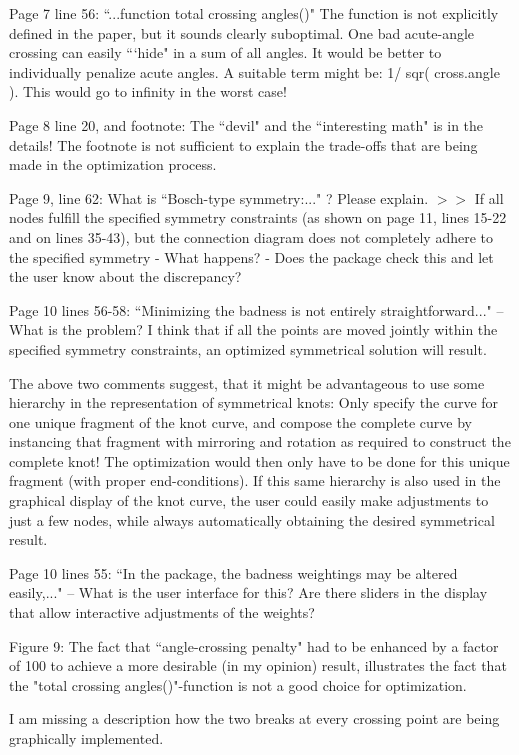 \documentclass[12pt]{article}
\begin{document}
Page 7 line 56: ``...function total crossing angles()" The function is
not explicitly defined in the paper, but it sounds clearly suboptimal.
One bad acute-angle crossing can easily ```hide" in a sum of all angles.
It would be better to individually penalize acute angles.  A suitable
term might be: 1/ sqr( cross.angle ).  This would go to infinity in
the worst case!

Page 8 line 20, and footnote: The ``devil" and the ``interesting math"
is in the details!  The footnote is not sufficient to explain the
trade-offs that are being made in the optimization process.

Page 9, line 62: What is ``Bosch-type symmetry:..." ?  Please explain.
$>>$ If all nodes fulfill the specified symmetry constraints (as shown
on page 11, lines 15-22 and on lines 35-43), but the connection
diagram does not completely adhere to the specified symmetry - What
happens? - Does the package check this and let the user know about the
discrepancy?

Page 10 lines 56-58: ``Minimizing the badness is not entirely
straightforward..."  -- What is the problem?  I think that if all the
points are moved jointly within the specified symmetry constraints, an
optimized symmetrical solution will result.

{The above two comments suggest, that it might be advantageous to use
  some hierarchy in the representation of symmetrical knots: Only
  specify the curve for one unique fragment of the knot curve, and
  compose the complete curve by instancing that fragment with
  mirroring and rotation as required to construct the complete knot!
  The optimization would then only have to be done for this unique
  fragment (with proper end-conditions).  If this same hierarchy is
  also used in the graphical display of the knot curve, the user could
  easily make adjustments to just a few nodes, while always
  automatically obtaining the desired symmetrical result.}

Page 10 lines 55: ``In the package, the badness weightings may be
altered easily,..."  -- What is the user interface for this?  Are
there sliders in the display that allow interactive adjustments of the
weights?

Figure 9: The fact that ``angle-crossing penalty" had to be enhanced by
a factor of 100 to achieve a more desirable (in my opinion) result,
illustrates the fact that the "total crossing angles()"-function is
not a good choice for optimization.

I am missing a description how the two breaks at every crossing point
are being graphically implemented.
\end{document}

